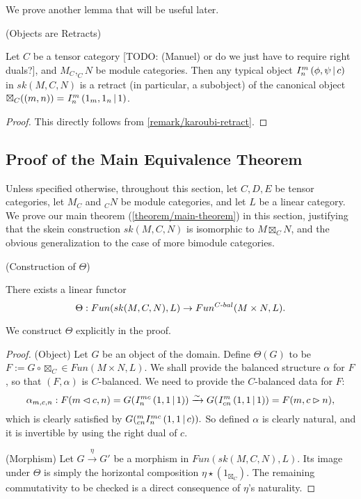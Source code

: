 \hfill\break
\noindent We prove another lemma that will be useful later.

\begin{lemma}\label{lemma/I-provides-subobject} (Objects are Retracts)

  \noindent Let $C$ be a tensor category [TODO: (Manuel) or do we just have to require right duals?], and $M_{C}, _{C}N$ be module
  categories. \quad Then any typical object ${}^{}_{} I^{m}_{n} \left( \phi, \psi \,\middle|\, c \right)$ in
  $sk(M,C,N)$ is a retract (in particular, a subobject) of the canonical
  object $\boxtimes_{C}((m,n)) = {}^{}_{} I^{m}_{n} \left( 1_{m}, 1_{n} \,\middle|\, 1 \right)$.
\end{lemma}
\begin{proof}
  This directly follows from \ref{remark/karoubi-retract}.
\end{proof}



\subsection{Proof of the Main Equivalence Theorem}\label{section/proof-of-equivalence}

Unless specified otherwise, throughout this section, let $C, D, E$ be tensor
categories, let $M_{C}$ and $_{C}N$ be module categories, and let $L$ be a
linear category. We prove our main theorem (\ref{theorem/main-theorem}) in this section, justifying
that the skein construction $sk(M,C,N)$ is isomorphic to $M \boxtimes_{C} N$, and the
obvious generalization to the case of more bimodule categories.

\begin{lemma}\label{lemma/construction-of-theta} (Construction of $\Theta$)

  \noindent There exists a linear functor
  \[
    \Theta: Fun(sk(M,C,N), L) \to Fun^{C{\text -}bal}(M \times N, L).
  \]
\end{lemma}

\noindent We construct $\Theta$ explicitly in the proof.

\begin{proof}
  \noindent (Object) Let $G$ be an object of the domain. Define $\Theta(G)$ to
  be $F := G \circ \boxtimes_{C} \in Fun(M \times N, L)$. We shall provide the
  balanced structure $\alpha$ for $F$, so that $(F, \alpha)$ is $C$-balanced. 
  We need to provide the $C$-balanced data for $F$:
  \[
    \alpha_{m,c,n}: F(m \lhd c, n) =
    G({}^{}_{} I^{mc}_{n} \left( 1, 1 \,\middle|\, 1 \right))
    \xrightarrow{\sim} G({}^{}_{} I^{m}_{cn} \left( 1, 1 \,\middle|\, 1 \right))
    = F(m, c \rhd n),
  \]
  which is clearly satisfied by $G({}^{m}_{cn} I^{mc}_{n} \left( 1, 1 \,\middle|\, c \right)).$ So defined
  $\alpha$ is clearly natural, and it is invertible by using the right dual of $c$.

  \noindent (Morphism) Let $G \xrightarrow{\eta} G'$ be a morphism in
  $Fun(sk(M,C,N), L)$. Its image under $\Theta$ is simply the horizontal
  composition $\eta \star (1_{\boxtimes_{C}})$. The remaining commutativity to be checked
  is a direct consequence of $\eta$'s naturality.
\end{proof}

